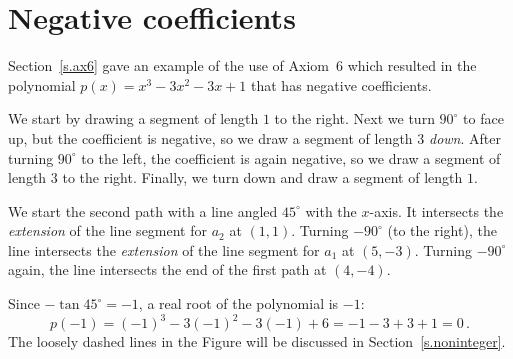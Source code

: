 \newpage

\section{Negative coefficients}\label{s.negative}

Section~\ref{s.ax6} gave an example of the use of Axiom~6 which resulted in the polynomial $p(x)=x^3-3x^2-3x+1$ that has negative coefficients.

We start by drawing a segment of length $1$ to the right. Next we turn $90^\circ$ to face up, but the coefficient is negative, so we draw a segment of length $3$ \emph{down}. After turning $90^\circ$ to the left, the coefficient is again negative, so we draw a segment of length $3$ to the right. Finally, we turn down and draw a segment of length $1$.

We start the second path with a line angled $45^\circ$ with the $x$-axis. It intersects the \emph{extension} of the line segment for $a_2$ at $(1,1)$. Turning $-90^\circ$ (to the right), the line intersects the \emph{extension} of the line segment for $a_1$ at $(5,-3)$. Turning $-90^\circ$ again, the line intersects the end of the first path at $(4,-4)$.

Since $-\tan 45^\circ=-1$, a real root of the polynomial is $-1$:
\[
p(-1)=(-1)^3-3(-1)^2-3(-1)+6=-1-3+3+1=0\,.
\]
The loosely dashed lines in the Figure will be discussed  in Section~\ref{s.noninteger}.

